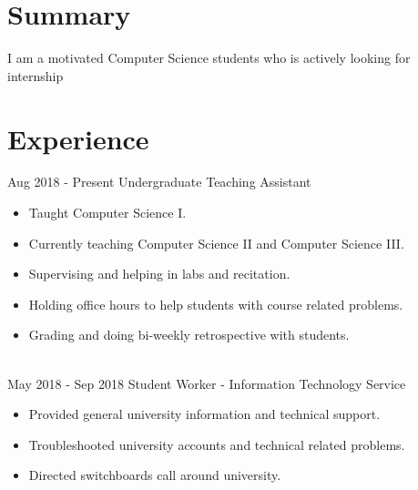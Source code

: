\documentclass[letterpaper]{twentysecondcv} %
\begin{document}
\makeprofile %
 \section{Summary}
    I am a motivated Computer Science students who is actively looking for internship

\section{Experience}

\begin{twenty} %
\twentyitem
    	{Aug 2018 -}
		{Present}
        {Undergraduate Teaching Assistant}
        {}
        {}
        {\begin{itemize}
        \item Taught Computer Science I.
        \item Currently teaching Computer Science II and Computer Science III.
        \item Supervising and helping in labs and recitation.
        \item Holding office hours to help students with course related problems.
        \item Grading and doing bi-weekly retrospective with students.
        \end{itemize}}
        \\
	\twentyitem
    	{May 2018 -}
		{Sep 2018}
        {Student Worker - Information Technology Service}
        {}
        {}
        {
        {\begin{itemize}
        \item Provided general university information and technical support.
        \item Troubleshooted university accounts and technical related problems.
        \item Directed switchboards call around university.
    \end{itemize}}
        }
    
        
\end{twenty}

\end{document}
